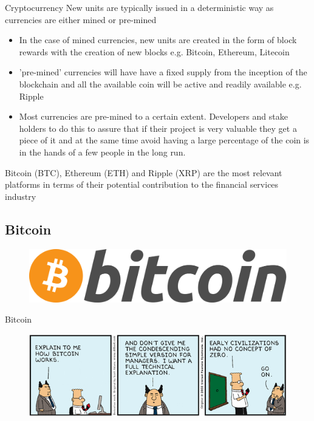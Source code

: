 \documentclass[9pt]{beamer}
\begin{document}
\begin{frame}{Cryptocurrency}
		New units are typically issued in a deterministic way as currencies are either mined or pre-mined
	\begin{itemize}
		\item In the case of mined currencies, new units are created in the form of block rewards with the creation of new blocks e.g. Bitcoin, Ethereum, Litecoin
		\item 'pre-mined' currencies will have have a fixed supply from the inception of the blockchain and all the available coin will be active and readily available e.g. Ripple
		\item Most currencies are pre-mined to a certain extent. Developers and stake holders to do this to assure that if their project is very valuable they get a piece of it and at the same time avoid having a large percentage of the coin is in the hands of a few people in the long run.
	\end{itemize}
	Bitcoin (BTC), Ethereum (ETH) and Ripple (XRP) are the most relevant platforms in terms of their potential contribution to the financial services industry
\end{frame}


\subsection{Bitcoin}

\begin{frame}
	\begin{figure}[]
		\centering
		\includegraphics  [scale=0.1]{Images/bitcoin-logo}
	\end{figure}
\end{frame}


\begin{frame}{Bitcoin}
	\begin{figure}[]
		\centering
		\includegraphics  [scale=0.5]{Images/dilbert-bitcoin}
	\end{figure}
\end{frame}
\end{document}

